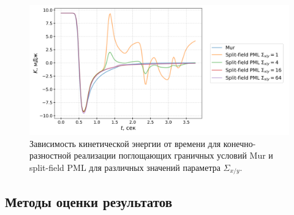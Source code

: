 \begin{figure}[H]
    \centering
    \includegraphics[width=1.0\textwidth]{images/pml/fd_split_field.png}
    \caption{Зависимость кинетической энергии от времени для конечно-разностной реализации поглощающих граничных условий Mur и split-field PML для различных значений параметра $\Sigma_{x/y}$.}
    \label{fig:fd_split_field_pml}
\end{figure}

\subsection{Методы оценки результатов}


